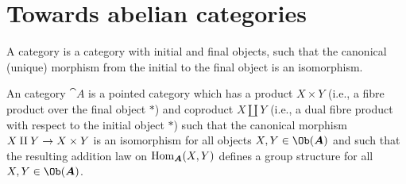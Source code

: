 \documentclass[a4paper,parskip=half,numbers=enddot, DIV=12]{scrreprt}
\begin{document}
\section{Towards abelian categories}
\begin{defi}
	\begin{alphanumerate}
		\item {}A  category is a category with initial and final objects, such that the canonical (unique) morphism from the initial to the final object is an isomorphism.
		\item An  category ${\cat A}$ is a pointed category which has a product $X\times Y$ (i.e., a fibre product over the final object $*$) and coproduct $X\amalg Y$ (i.e., a dual fibre product with respect to the initial object $*$) such that the canonical morphism $X\amalg Y\morphism X\times Y$ is an isomorphism for all objects $X,Y\in\Ob({\cat A})$ and such that the resulting addition law on $\Hom_{\cat A}(X,Y)$ defines a group structure for all $X,Y\in\Ob({\cat A})$.
	\end{alphanumerate}
\end{defi}
\end{document}
